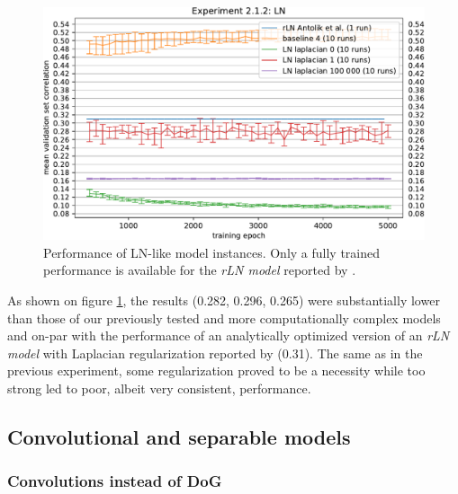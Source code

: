 \begin{figure}[H]
    \centering
    \includegraphics[width=1\textwidth]{../figures/05_2_1_2}
    \caption[Experiment 2.1.2]{Performance of LN-like model instances. Only a fully trained performance is available for the \textit{rLN model} reported by \citeauthor{antolik}\protect\footnotemark.}
    \label{fig:5.2.1.2}
\end{figure}

As shown on figure \ref{fig:5.2.1.2}, the results (0.282, 0.296, 0.265) were substantially lower than those of our previously tested and more computationally complex models and on-par with the performance of an analytically optimized version of an \textit{rLN model} with Laplacian regularization reported by \cite{antolik} (0.31). The same as in the previous experiment, some regularization proved to be a necessity while too strong led to poor, albeit very consistent, performance.

\subsection{Convolutional and separable models}
\subsubsection{Convolutions instead of DoG}\label{ex:2.2.1}

